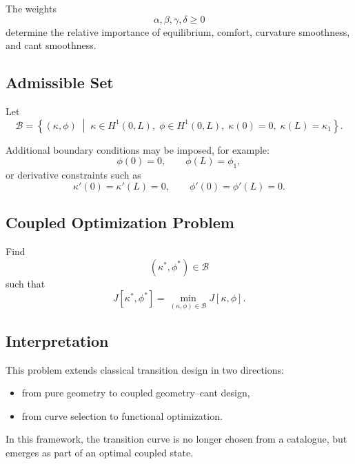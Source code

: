 \begin{remark}
The weights
\[
\alpha,\beta,\gamma,\delta \ge 0
\]
determine the relative importance of equilibrium, comfort, curvature
smoothness, and cant smoothness.
\end{remark}

\subsection{Admissible Set}

\begin{definition}
Let
\[
\mathcal{B}
=
\left\{
(\kappa,\phi)
\;\middle|\;
\kappa \in H^1(0,L),\;
\phi \in H^1(0,L),
\;
\kappa(0)=0,\;
\kappa(L)=\kappa_1
\right\}.
\]
\end{definition}

\begin{remark}
Additional boundary conditions may be imposed, for example:
\[
\phi(0)=0,
\qquad
\phi(L)=\phi_1,
\]
or derivative constraints such as
\[
\kappa'(0)=\kappa'(L)=0,
\qquad
\phi'(0)=\phi'(L)=0.
\]
\end{remark}

\subsection{Coupled Optimization Problem}

\begin{definition}
Find
\[
(\kappa^\ast,\phi^\ast)\in\mathcal{B}
\]
such that
\[
J[\kappa^\ast,\phi^\ast]
=
\min_{(\kappa,\phi)\in\mathcal{B}} J[\kappa,\phi].
\]
\end{definition}

\subsection{Interpretation}

\begin{remark}
This problem extends classical transition design in two directions:
\begin{itemize}
\item from pure geometry to coupled geometry--cant design,
\item from curve selection to functional optimization.
\end{itemize}
\end{remark}

\begin{remark}
In this framework, the transition curve is no longer chosen from a
catalogue, but emerges as part of an optimal coupled state.
\end{remark}

